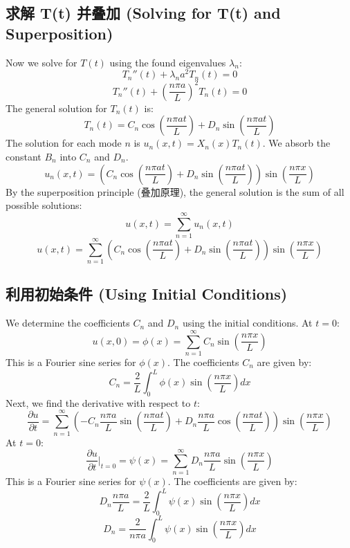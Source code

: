 \documentclass{article}
\begin{document}
	\subsection*{求解 T(t) 并叠加 (Solving for T(t) and Superposition)}
	Now we solve for $T(t)$ using the found eigenvalues $\lambda_n$:
	$$ T_n''(t) + \lambda_n a^2 T_n(t) = 0 $$
	$$ T_n''(t) + \left(\frac{n\pi a}{L}\right)^2 T_n(t) = 0 $$
	The general solution for $T_n(t)$ is:
	$$ T_n(t) = C_n \cos\left(\frac{n\pi a t}{L}\right) + D_n \sin\left(\frac{n\pi a t}{L}\right) $$
	The solution for each mode $n$ is $u_n(x,t) = X_n(x) T_n(t)$. We absorb the constant $B_n$ into $C_n$ and $D_n$.
	$$ u_n(x,t) = \left(C_n \cos\left(\frac{n\pi a t}{L}\right) + D_n \sin\left(\frac{n\pi a t}{L}\right)\right) \sin\left(\frac{n\pi x}{L}\right) $$
	By the superposition principle (叠加原理), the general solution is the sum of all possible solutions:
	$$ u(x,t) = \sum_{n=1}^{\infty} u_n(x,t) $$
	$$ u(x,t) = \sum_{n=1}^{\infty} \left(C_n \cos\left(\frac{n\pi a t}{L}\right) + D_n \sin\left(\frac{n\pi a t}{L}\right)\right) \sin\left(\frac{n\pi x}{L}\right) $$
	
	\subsection*{利用初始条件 (Using Initial Conditions)}
	We determine the coefficients $C_n$ and $D_n$ using the initial conditions.
	At $t=0$:
	$$ u(x,0) = \phi(x) = \sum_{n=1}^{\infty} C_n \sin\left(\frac{n\pi x}{L}\right) $$
	This is a Fourier sine series for $\phi(x)$. The coefficients $C_n$ are given by:
	$$ C_n = \frac{2}{L} \int_0^L \phi(x) \sin\left(\frac{n\pi x}{L}\right) dx $$
	Next, we find the derivative with respect to $t$:
	$$ \frac{\partial u}{\partial t} = \sum_{n=1}^{\infty} \left(-C_n \frac{n\pi a}{L} \sin\left(\frac{n\pi a t}{L}\right) + D_n \frac{n\pi a}{L} \cos\left(\frac{n\pi a t}{L}\right)\right) \sin\left(\frac{n\pi x}{L}\right) $$
	At $t=0$:
	$$ \frac{\partial u}{\partial t}\bigg|_{t=0} = \psi(x) = \sum_{n=1}^{\infty} D_n \frac{n\pi a}{L} \sin\left(\frac{n\pi x}{L}\right) $$
	This is a Fourier sine series for $\psi(x)$. The coefficients are given by:
	$$ D_n \frac{n\pi a}{L} = \frac{2}{L} \int_0^L \psi(x) \sin\left(\frac{n\pi x}{L}\right) dx $$
	$$ D_n = \frac{2}{n\pi a} \int_0^L \psi(x) \sin\left(\frac{n\pi x}{L}\right) dx $$
	
\end{document}
